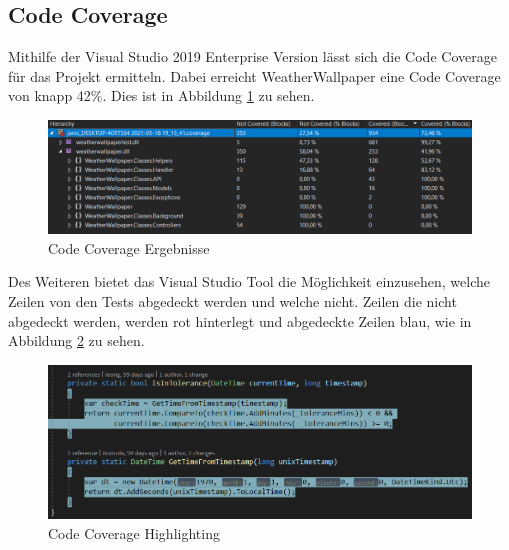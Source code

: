 \subsection{Code Coverage}
Mithilfe der Visual Studio 2019 Enterprise Version lässt sich die Code Coverage für das Projekt ermitteln. Dabei erreicht WeatherWallpaper eine Code Coverage von knapp 42\%. Dies ist in Abbildung \ref{CodeCoverage} zu sehen. 
\begin{figure}[ht]
\centering
\includegraphics[width=\textwidth]{Bilder/CodeCoverage}
\caption[Code Coverage Ergebnisse]{\label{CodeCoverage} Code Coverage Ergebnisse}
\end{figure}
Des Weiteren bietet das Visual Studio Tool die Möglichkeit einzusehen, welche Zeilen von den Tests abgedeckt werden und welche nicht. Zeilen die nicht abgedeckt werden, werden rot hinterlegt und abgedeckte Zeilen blau, wie in Abbildung \ref{CodeCoverageHighlight} zu sehen.
\begin{figure}[ht]
\centering
\includegraphics[width=\textwidth]{Bilder/CodeCoverageHighlighted}
\caption[Code Coverage Ergebnisse]{\label{CodeCoverageHighlight} Code Coverage Highlighting}
\end{figure}